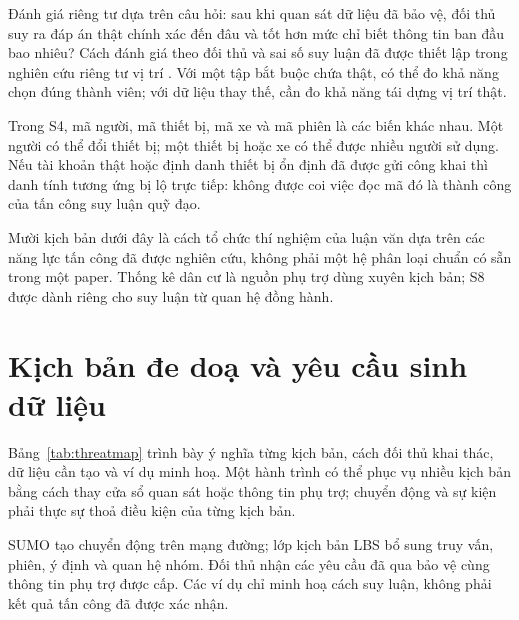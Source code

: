 \documentclass[12pt,a4paper,oneside]{report}
\begin{document}
Đánh giá riêng tư dựa trên câu hỏi: sau khi quan sát dữ liệu đã bảo vệ, đối thủ suy ra đáp án thật chính xác đến đâu và tốt hơn mức chỉ biết thông tin ban đầu bao nhiêu? Cách đánh giá theo đối thủ và sai số suy luận đã được thiết lập trong nghiên cứu riêng tư vị trí \citep{shokri2011quantifying}. Với một tập bắt buộc chứa thật, có thể đo khả năng chọn đúng thành viên; với dữ liệu thay thế, cần đo khả năng tái dựng vị trí thật.

Trong S4, mã người, mã thiết bị, mã xe và mã phiên là các biến khác nhau. Một người có thể đổi thiết bị; một thiết bị hoặc xe có thể được nhiều người sử dụng. Nếu tài khoản thật hoặc định danh thiết bị ổn định đã được gửi công khai thì danh tính tương ứng bị lộ trực tiếp: không được coi việc đọc mã đó là thành công của tấn công suy luận quỹ đạo.

Mười kịch bản dưới đây là cách tổ chức thí nghiệm của luận văn dựa trên các năng lực tấn công đã được nghiên cứu, không phải một hệ phân loại chuẩn có sẵn trong một paper. Thống kê dân cư là nguồn phụ trợ dùng xuyên kịch bản; S8 được dành riêng cho suy luận từ quan hệ đồng hành.

\clearpage
\section{Kịch bản đe doạ và yêu cầu sinh dữ liệu}

Bảng~\ref{tab:threatmap} trình bày ý nghĩa từng kịch bản, cách đối thủ khai thác, dữ liệu cần tạo và ví dụ minh hoạ. Một hành trình có thể phục vụ nhiều kịch bản bằng cách thay cửa sổ quan sát hoặc thông tin phụ trợ; chuyển động và sự kiện phải thực sự thoả điều kiện của từng kịch bản.

SUMO tạo chuyển động trên mạng đường; lớp kịch bản LBS bổ sung truy vấn, phiên, ý định và quan hệ nhóm. Đối thủ nhận các yêu cầu đã qua bảo vệ cùng thông tin phụ trợ được cấp. Các ví dụ chỉ minh hoạ cách suy luận, không phải kết quả tấn công đã được xác nhận.
\end{document}
